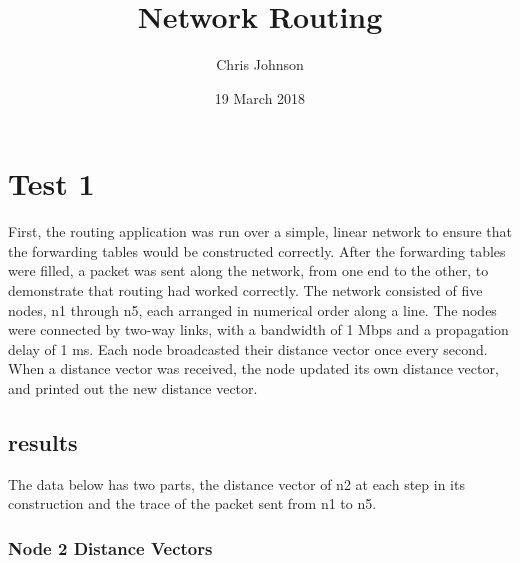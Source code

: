 \documentclass[fleqn,11pt]{article}
\begin{document}
	
	\lstset{
	  language=Python,
	  basicstyle=\small,          %
	  keywordstyle=\bfseries,
	  identifierstyle=,           %
	  commentstyle=,              %
	  stringstyle=\ttfamily,      %
	  showstringspaces=false,     %
	  numberstyle=\tiny,
	  numbersep=5pt,
	  frame=tb,
	}
	
	\title{Network Routing}
	
	\author{Chris Johnson}
	
	\date{19 March 2018}
	
	\maketitle
	
	\section{Test 1}
	
	First, the routing application was run over a simple, linear network to ensure that the forwarding
	tables would be constructed correctly. After the forwarding tables were filled, a packet was sent along
	the network, from one end to the other, to demonstrate that routing had worked correctly. 
	The network consisted of five nodes, n1
	through n5, each arranged in numerical order along a line. The nodes were connected by two-way links, with
	a bandwidth of 1 Mbps and a propagation delay of 1 ms. Each node broadcasted their distance vector once
	every second. When a distance vector was received, the node updated its own distance vector, and printed out
	the new distance vector.
	
	\subsection{results}
	
	The data below has two parts, the distance vector of n2 at each step in its construction and the trace of the
	packet sent from n1 to n5.
	
	\subsubsection{Node 2 Distance Vectors}
	
\end{document}
